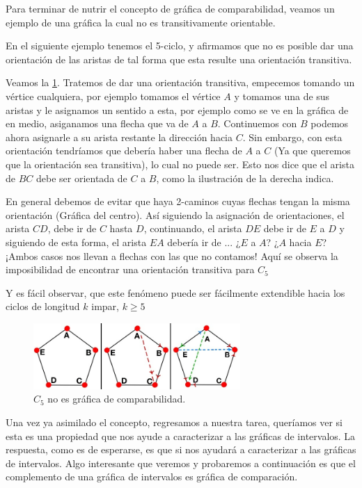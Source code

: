 Para terminar de nutrir el concepto de gráfica de comparabilidad, veamos un
ejemplo de una gráfica la cual no es transitivamente orientable.

En el siguiente ejemplo tenemos el 5-ciclo, y afirmamos que no es posible dar
una orientación de las aristas de tal forma que esta resulte una orientación
transitiva.
    
Veamos la \cref{fig:207}. Tratemos de dar una orientación transitiva, empecemos
tomando un vértice cualquiera, por ejemplo tomamos el vértice $A$ y tomamos una
de sus aristas y le asignamos un sentido a esta, por ejemplo como se ve en la
gráfica de en medio, asiganamos una flecha que va de $A$ a $B$. Continuemos con
$B$ podemos ahora asignarle a su arista restante la dirección hacia $C$. Sin
embargo, con esta orientación tendríamos que debería haber una flecha de $A$ a
$C$ (Ya que queremos que la orientación sea transitiva), lo cual no puede ser.
Esto nos dice que el arista de $BC$ debe ser orientada de $C$ a $B$, como la
ilustración de la derecha indica.
    
En general debemos de evitar que haya 2-caminos cuyas  flechas tengan la misma
orientación (Gráfica del centro). Así siguiendo la asignación de orientaciones,
el arista $CD$, debe ir de $C$ hasta $D$, continuando, el arista $DE$ debe ir de
$E$ a $D$ y siguiendo de esta forma, el arista $EA$ debería ir de ... ¿$E$ a
$A$? ¿$A$ hacia $E$? ¡Ambos casos nos llevan a flechas con las que no contamos!
Aquí se observa la imposibilidad de encontrar una orientación transitiva para
$C_5$

Y es fácil observar, que este fenómeno puede ser fácilmente extendible hacia los
ciclos de longitud $k$ impar, $k\geq 5$

\begin{figure}[H]
  \centering
  \includegraphics[width=0.7\textwidth]{recursos/capturas/207.jpg}
  \caption{$C_5$ no es gráfica de comparabilidad.}
  \label{fig:207}
\end{figure}

Una vez ya asimilado el concepto, regresamos a nuestra tarea, queríamos ver si
esta es una propiedad que nos ayude a caracterizar a las gráficas de intervalos.
La respuesta, como es de esperarse, es que si nos ayudará a caracterizar a las
gráficas de intervalos. Algo interesante que veremos y probaremos a continuación
es que el complemento de una gráfica de intervalos es gráfica de comparación.

